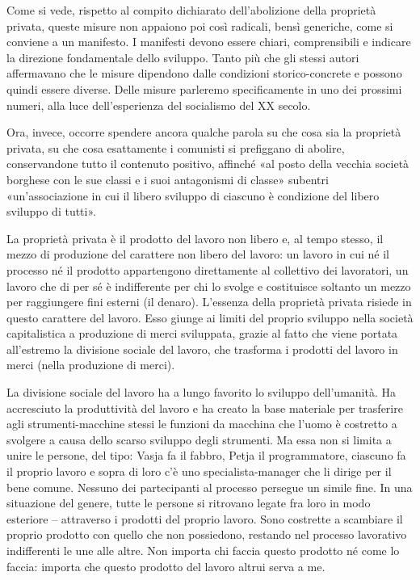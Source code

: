 \documentclass[12pt,a4paper,openany]{book}
\begin{document}
Come si vede, rispetto al compito dichiarato dell'abolizione della proprietà privata, queste misure non appaiono poi così radicali, bensì generiche, come si conviene a un manifesto. I manifesti devono essere chiari, comprensibili e indicare la direzione fondamentale dello sviluppo. Tanto più che gli stessi autori affermavano che le misure dipendono dalle condizioni storico-concrete e possono quindi essere diverse. Delle misure parleremo specificamente in uno dei prossimi numeri, alla luce dell'esperienza del socialismo del XX secolo.

Ora, invece, occorre spendere ancora qualche parola su che cosa sia la proprietà privata, su che cosa esattamente i comunisti si prefiggano di abolire, conservandone tutto il contenuto positivo, affinché «al posto della vecchia società borghese con le sue classi e i suoi antagonismi di classe» subentri «un'associazione in cui il libero sviluppo di ciascuno è condizione del libero sviluppo di tutti».

La proprietà privata è il prodotto del lavoro non libero e, al tempo stesso, il mezzo di produzione del carattere non libero del lavoro: un lavoro in cui né il processo né il prodotto appartengono direttamente al collettivo dei lavoratori, un lavoro che di per sé è indifferente per chi lo svolge e costituisce soltanto un mezzo per raggiungere fini esterni (il denaro). L'essenza della proprietà privata risiede in questo carattere del lavoro. Esso giunge ai limiti del proprio sviluppo nella società capitalistica a produzione di merci sviluppata, grazie al fatto che viene portata all'estremo la divisione sociale del lavoro, che trasforma i prodotti del lavoro in merci (nella produzione di merci).

La divisione sociale del lavoro ha a lungo favorito lo sviluppo dell'umanità. Ha accresciuto la produttività del lavoro e ha creato la base materiale per trasferire agli strumenti-macchine stessi le funzioni da macchina che l'uomo è costretto a svolgere a causa dello scarso sviluppo degli strumenti. Ma essa non si limita a unire le persone, del tipo: Vasja fa il fabbro, Petja il programmatore, ciascuno fa il proprio lavoro e sopra di loro c'è uno specialista-manager che li dirige per il bene comune. Nessuno dei partecipanti al processo persegue un simile fine. In una situazione del genere, tutte le persone si ritrovano legate fra loro in modo esteriore – attraverso i prodotti del proprio lavoro. Sono costrette a scambiare il proprio prodotto con quello che non possiedono, restando nel processo lavorativo indifferenti le une alle altre. Non importa chi faccia questo prodotto né come lo faccia: importa che questo prodotto del lavoro altrui serva a me.
\end{document}
